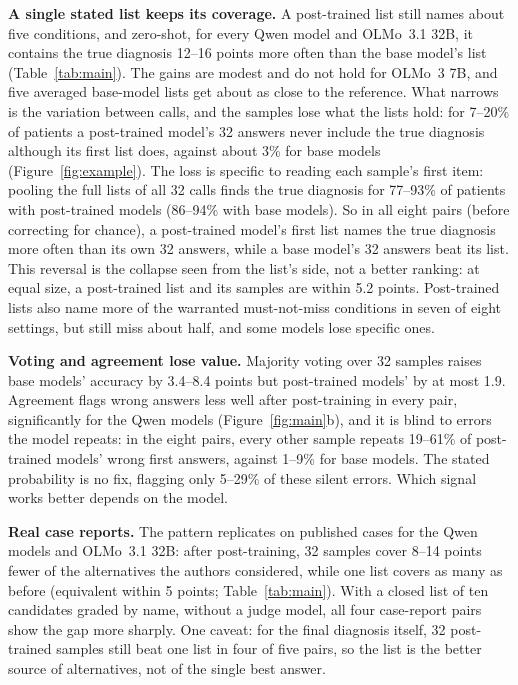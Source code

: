 \documentclass[letterpaper]{article} %
\begin{document}
\textbf{A single stated list keeps its coverage.} A post-trained list still names about five conditions, and zero-shot, for every Qwen model and OLMo~3.1 32B, it contains the true diagnosis 12--16 points more often than the base model's list (Table~\ref{tab:main}). The gains are modest and do not hold for OLMo~3 7B, and five averaged base-model lists get about as close to the reference. What narrows is the variation between calls, and the samples lose what the lists hold: for 7--20\% of patients a post-trained model's 32 answers never include the true diagnosis although its first list does, against about 3\% for base models (Figure~\ref{fig:example}). The loss is specific to reading each sample's first item: pooling the full lists of all 32 calls finds the true diagnosis for 77--93\% of patients with post-trained models (86--94\% with base models). So in all eight pairs (before correcting for chance), a post-trained model's first list names the true diagnosis more often than its own 32 answers, while a base model's 32 answers beat its list. This reversal is the collapse seen from the list's side, not a better ranking: at equal size, a post-trained list and its samples are within 5.2 points. Post-trained lists also name more of the warranted must-not-miss conditions in seven of eight settings, but still miss about half, and some models lose specific ones.

\textbf{Voting and agreement lose value.} Majority voting over 32 samples raises base models' accuracy by 3.4--8.4 points but post-trained models' by at most 1.9. Agreement flags wrong answers less well after post-training in every pair, significantly for the Qwen models (Figure~\ref{fig:main}b), and it is blind to errors the model repeats: in the eight pairs, every other sample repeats 19--61\% of post-trained models' wrong first answers, against 1--9\% for base models. The stated probability is no fix, flagging only 5--29\% of these silent errors. Which signal works better depends on the model.

\textbf{Real case reports.} The pattern replicates on published cases for the Qwen models and OLMo~3.1 32B: after post-training, 32 samples cover 8--14 points fewer of the alternatives the authors considered, while one list covers as many as before (equivalent within 5 points; Table~\ref{tab:main}). With a closed list of ten candidates graded by name, without a judge model, all four case-report pairs show the gap more sharply. One caveat: for the final diagnosis itself, 32 post-trained samples still beat one list in four of five pairs, so the list is the better source of alternatives, not of the single best answer.
\end{document}
